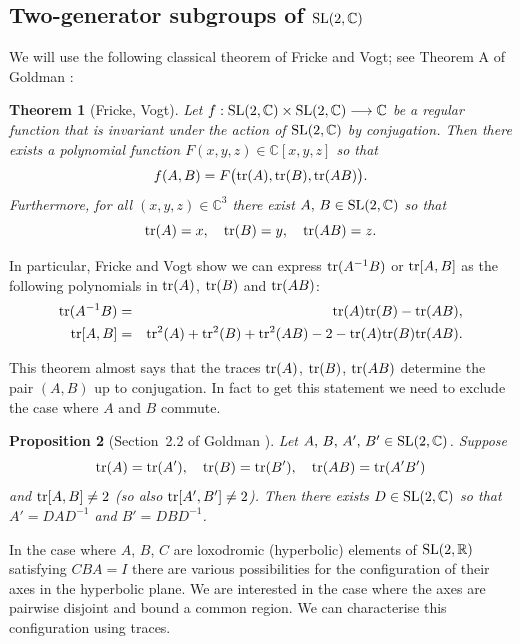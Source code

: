 \documentclass[11pt]{amsart}
\newtheorem{theorem}{Theorem}[section]
\newtheorem{proposition}[theorem]{Proposition}
\numberwithin{equation}{section}
\begin{document}
\medskip


\subsection{Two-generator subgroups of ${\rm SL}(2,{\mathbb C})$}

We will use the following classical theorem of Fricke and Vogt; see Theorem A of Goldman \cite{Gol1}:

\begin{theorem}[Fricke, Vogt] \label{thm-fv}
Let $f:{\rm SL}(2,{\mathbb C})\times {\rm SL}(2,{\mathbb C})\longrightarrow {\mathbb C}$ be a regular function that is
invariant under the action of ${\rm SL}(2,{\mathbb C})$ by conjugation. Then there exists a polynomial function 
$F(x,y,z)\in{\mathbb C}[x,y,z]$ so that
$$
f(A,B)=F\bigl({\rm tr}(A),{\rm tr}(B),{\rm tr}(AB)\bigr).
$$
Furthermore, for all $(x,y,z)\in{\mathbb C}^3$ there exist $A,\,B\in{\rm SL}(2,{\mathbb C})$ so that
$$
{\rm tr}(A)=x,\quad {\rm tr}(B)=y,\quad {\rm tr}(AB)=z.
$$
\end{theorem}

In particular, Fricke and Vogt show we can express ${\rm tr}(A^{-1}B)$ or ${\rm tr}[A,B]$ as the following 
polynomials in ${\rm tr}(A)$, ${\rm tr}(B)$ and ${\rm tr}(AB)$:
\begin{eqnarray}
{\rm tr}(A^{-1}B) & = & {\rm tr}(A){\rm tr}(B)-{\rm tr}(AB), \label{eq-fv1} \\
{\rm tr}[A,B] & = & {\rm tr}^2(A)+{\rm tr}^2(B)+{\rm tr}^2(AB)-2-{\rm tr}(A){\rm tr}(B){\rm tr}(AB). \label{eq-fv2}
\end{eqnarray} 

This theorem almost says that the traces ${\rm tr}(A)$, ${\rm tr}(B)$, ${\rm tr}(AB)$ determine the pair $(A,B)$ up to conjugation.
In fact to get this statement we need to exclude the case where $A$ and $B$ commute.

\begin{proposition}[Section~2.2 of Goldman \cite{Gol1}] Let $A,\,B,\,A',\,B'\in{\rm SL}(2,{\mathbb C})$. Suppose 
$$
{\rm tr}(A)={\rm tr}(A'),\quad {\rm tr}(B)={\rm tr}(B'),\quad {\rm tr}(AB)={\rm tr}(A'B')
$$
and ${\rm tr}[A,B]\neq 2$ (so also ${\rm tr}[A',B']\neq 2$). Then there exists $D\in{\rm SL}(2,{\mathbb C})$ so that
$A'=DAD^{-1}$ and $B'=DBD^{-1}$.
\end{proposition}

In the case where $A$, $B$, $C$ are loxodromic (hyperbolic) elements of ${\rm SL}(2,{\mathbb R})$ satisfying
$CBA=I$ there are various possibilities for the configuration of their axes in the hyperbolic plane. We are interested
in the case where the axes are pairwise disjoint and bound a common region. We can characterise this
configuration using traces.
\end{document}
